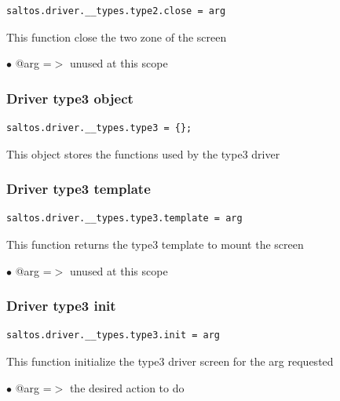\documentclass[a4paper]{article}
\begin{document}
\begin{lstlisting}
saltos.driver.__types.type2.close = arg
\end{lstlisting}

This function close the two zone of the screen

\begin{compactitem}
\item[\color{myblue}$\bullet$] @arg =$>$ unused at this scope
\end{compactitem}

\hypertarget{toc191}{}
\subsubsection{Driver type3 object}

\begin{lstlisting}
saltos.driver.__types.type3 = {};
\end{lstlisting}

This object stores the functions used by the type3 driver

\hypertarget{toc192}{}
\subsubsection{Driver type3 template}

\begin{lstlisting}
saltos.driver.__types.type3.template = arg
\end{lstlisting}

This function returns the type3 template to mount the screen

\begin{compactitem}
\item[\color{myblue}$\bullet$] @arg =$>$ unused at this scope
\end{compactitem}

\hypertarget{toc193}{}
\subsubsection{Driver type3 init}

\begin{lstlisting}
saltos.driver.__types.type3.init = arg
\end{lstlisting}

This function initialize the type3 driver screen for the arg requested

\begin{compactitem}
\item[\color{myblue}$\bullet$] @arg =$>$ the desired action to do
\end{compactitem}
\end{document}

